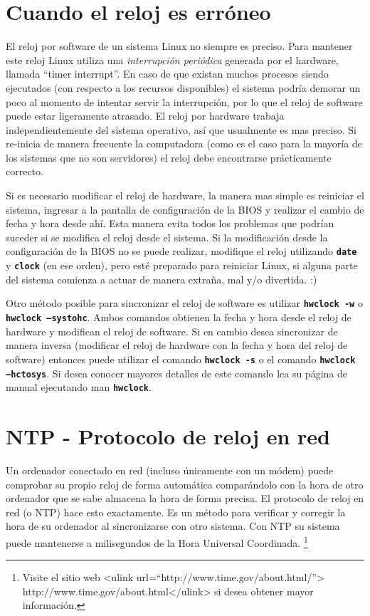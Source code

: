 \documentclass[12pt]{article}
\begin{document}
\section*{Cuando el reloj es erróneo}


El reloj por software de un sistema Linux no siempre es preciso. Para mantener este reloj
Linux utiliza una \textit{interrupción periódica} generada por el hardware, llamada ``timer interrupt''.
En caso de que existan muchos procesos siendo ejecutados (con respecto a los recursos disponibles)
el sistema podría demorar un poco al momento de intentar servir la interrupción, por lo que 
el reloj de software puede estar ligeramente atrasado. El reloj por hardware trabaja
independientemente del sistema operativo, así que usualmente es mas preciso. 
Si re-inicia de manera frecuente la computadora (como es el caso para la mayoría de los
sistemas que no son servidores) el reloj debe encontrarse prácticamente correcto.



Si es necesario modificar el reloj de hardware, la manera mas simple es reiniciar el sistema,
ingresar a la pantalla de configuración de la BIOS y realizar el cambio de fecha y hora desde
ahí. Esta manera evita todos los problemas que podrían suceder si se modifica el reloj desde 
el sistema. Si la modificación desde la configuración de la BIOS no se puede realizar, modifique
el reloj utilizando \texttt{\textbf{date}} y \texttt{\textbf{clock}} (en ese orden), pero esté preparado para reiniciar Linux, si
alguna parte del sistema comienza a actuar de manera extraña, mal y/o divertida. :)



Otro método posible para sincronizar el reloj de software es utilizar \texttt{\textbf{hwclock -w}} o \texttt{\textbf{hwclock --systohc}}.
Ambos comandos obtienen la fecha y hora desde el reloj de hardware y modifican el reloj de software.
Si en cambio desea sincronizar de manera inversa (modificar el reloj de hardware con la fecha y
hora del reloj de software) entonces puede utilizar el comando \texttt{\textbf{hwclock -s}} o el comando
\texttt{\textbf{hwclock --hctosys}}. Si desea conocer mayores detalles de este comando lea su página de manual
ejecutando man \texttt{\textbf{hwclock}}.


\section*{NTP - Protocolo de reloj en red}


Un ordenador conectado en red (incluso únicamente con un módem) puede 
comprobar su propio reloj de forma automática comparándolo con la hora
de otro ordenador que se sabe almacena la hora de forma precisa. El 
protocolo de reloj en red (o NTP) hace esto exactamente. Es un método para 
verificar y corregir la hora de su ordenador al sincronizarse con otro 
sistema. Con NTP su sistema puede mantenerse a milisegundos de la Hora 
Universal Coordinada. 
	\footnote{Visite el sitio web <ulink url=``http://www.time.gov/about.html/''>
		http://www.time.gov/about.html</ulink> si desea obtener mayor información.
		}
	
\end{document}
